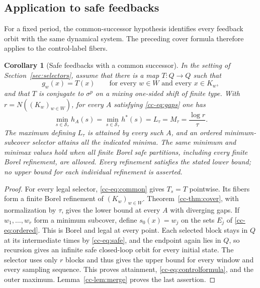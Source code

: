 \documentclass[11pt,reqno]{amsart}
\numberwithin{equation}{section}
\newtheorem{corollary}[theorem]{Corollary}
\theoremstyle{definition}
\theoremstyle{definition}
\newcommand{\hpat}{h^{*}}
\newcommand{\Ssafe}{\mathcal S}
\begin{document}
\subsection{Application to safe feedbacks}\label{sec:common-successor}

For a fixed period, the common-successor hypothesis identifies every
feedback orbit with the same dynamical system. The preceding cover
formula therefore applies to the control-label fibers.

\begin{corollary}[Safe feedbacks with a common successor]\label{cc-thm:control}
In the setting of Section~\ref{sec:selectors}, assume that there is
a map $T:Q\to Q$ such that
\begin{equation}\label{cc-eq:common}
 g_w(x)=T(x)\qquad\text{for every }w\in W\text{ and every }x\in K_w,
\end{equation}
and that $T$ is conjugate to $\sigma^p$ on a mixing one-sided shift of
finite type. With $r=N((K_w)_{w\in W})$, for every $A$ satisfying
\eqref{cc-eq:gaps} one has
\begin{equation}\label{cc-eq:controlformula}
 \min_{s\in\Ssafe_\tau}h_A(s)
 =\min_{s\in\Ssafe_\tau}\hpat(s)
 =L_\tau=M_\tau=\frac{\log r}{\tau}.
\end{equation}
The maximum defining $L_\tau$ is attained by every such $A$, and an
ordered minimum-subcover selector attains all the indicated minima.
The same minimum and minimax values hold when all finite Borel safe
partitions, including every finite Borel refinement, are allowed. Every
refinement satisfies the stated lower bound; no upper bound for each
individual refinement is asserted.
\end{corollary}
\begin{proof}
For every legal selector, \eqref{cc-eq:common} gives $T_s=T$ pointwise.
Its fibers form a finite Borel refinement of $(K_w)_{w\in W}$.
Theorem~\ref{cc-thm:cover}, with normalization by $\tau$, gives the lower
bound at every $A$ with diverging gaps. If $w_1,\ldots,w_r$ form a
minimum subcover, define $s_0(x)=w_j$ on the sets $E_j$ of
\eqref{cc-eq:ordered}. This is Borel and legal at every point. Each selected
block stays in $Q$ at its intermediate times by \eqref{cc-eq:safe}, and
the endpoint again lies in $Q$, so recursion gives an infinite safe
closed-loop orbit for every initial state. The selector uses only $r$
blocks and thus gives the upper bound for every window and every
sampling sequence. This proves attainment, \eqref{cc-eq:controlformula},
and the outer maximum. Lemma~\ref{cc-lem:merge} proves the last assertion.
\end{proof}
\end{document}
